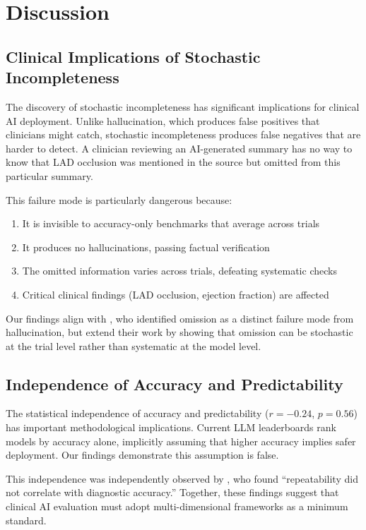 \documentclass[11pt]{article}
\begin{document}
\section{Discussion}

\subsection{Clinical Implications of Stochastic Incompleteness}

The discovery of stochastic incompleteness has significant implications for clinical AI deployment. Unlike hallucination, which produces false positives that clinicians might catch, stochastic incompleteness produces false negatives that are harder to detect. A clinician reviewing an AI-generated summary has no way to know that LAD occlusion was mentioned in the source but omitted from this particular summary.

This failure mode is particularly dangerous because:
\begin{enumerate}
    \item It is invisible to accuracy-only benchmarks that average across trials
    \item It produces no hallucinations, passing factual verification
    \item The omitted information varies across trials, defeating systematic checks
    \item Critical clinical findings (LAD occlusion, ejection fraction) are affected
\end{enumerate}

Our findings align with \citet{asgari2025framework}, who identified omission as a distinct failure mode from hallucination, but extend their work by showing that omission can be stochastic at the trial level rather than systematic at the model level.

\subsection{Independence of Accuracy and Predictability}

The statistical independence of accuracy and predictability ($r = -0.24$, $p = 0.56$) has important methodological implications. Current LLM leaderboards rank models by accuracy alone, implicitly assuming that higher accuracy implies safer deployment. Our findings demonstrate this assumption is false.

This independence was independently observed by \citet{shyr2025statistical}, who found ``repeatability did not correlate with diagnostic accuracy.'' Together, these findings suggest that clinical AI evaluation must adopt multi-dimensional frameworks as a minimum standard.
\end{document}
